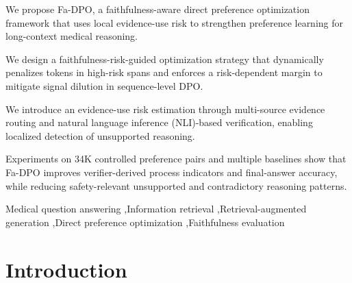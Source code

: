 \documentclass[a4paper,fleqn,doubleblind]{cas-sc}
\begin{document}
\begin{highlights}
\item We propose Fa-DPO, a faithfulness-aware direct preference optimization framework that uses local evidence-use risk to strengthen preference learning for long-context medical reasoning.
\item We design a faithfulness-risk-guided optimization strategy that dynamically penalizes tokens in high-risk spans and enforces a risk-dependent margin to mitigate signal dilution in sequence-level DPO.
\item We introduce an evidence-use risk estimation through multi-source evidence routing and natural language inference (NLI)-based verification, enabling localized detection of unsupported reasoning.
\item Experiments on 34K controlled preference pairs and multiple baselines show that Fa-DPO improves verifier-derived process indicators and final-answer accuracy, while reducing safety-relevant unsupported and contradictory reasoning patterns.
\end{highlights}





\begin{keywords}
Medical question answering \sep Information retrieval \sep Retrieval-augmented generation  \sep Direct preference optimization \sep Faithfulness evaluation
\end{keywords}

\maketitle




\section{Introduction}
\end{document}
